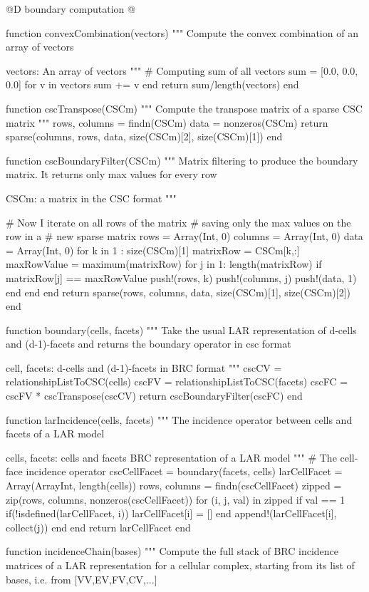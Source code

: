 \documentclass[11pt,oneside]{article}	%
\begin{document}
@D boundary computation
@{function convexCombination(vectors)
  """
  Compute the convex combination of an
  array of vectors

  vectors: An array of vectors
  """
  # Computing sum of all vectors
  sum = [0.0, 0.0, 0.0]
  for v in vectors
    sum += v
  end
  return sum/length(vectors)
end

function cscTranspose(CSCm)
  """
  Compute the transpose matrix of a
  sparse CSC matrix
  """
  rows, columns = findn(CSCm)
  data = nonzeros(CSCm)
  return sparse(columns, rows, data, size(CSCm)[2], size(CSCm)[1])
end

function cscBoundaryFilter(CSCm)
  """
  Matrix filtering to produce the boundary
  matrix. It returns only max values for
  every row

  CSCm: a matrix in the CSC format
  """

  # Now I iterate on all rows of the matrix
  # saving only the max values on the row in a
  # new sparse matrix
  rows = Array(Int, 0)
  columns = Array(Int, 0)
  data = Array(Int, 0)
  for k in 1 : size(CSCm)[1]
    matrixRow = CSCm[k,:]
    maxRowValue = maximum(matrixRow)
    for j in 1: length(matrixRow)
      if matrixRow[j] == maxRowValue
        push!(rows, k)
        push!(columns, j)
        push!(data, 1)
      end
    end
  end
  return sparse(rows, columns, data, size(CSCm)[1], size(CSCm)[2])
end

function boundary(cells, facets)
  """
  Take the usual LAR representation of d-cells
  and (d-1)-facets and returns the
  boundary operator in csc format

  cell, facets: d-cells and (d-1)-facets in BRC format
  """
  cscCV = relationshipListToCSC(cells)
  cscFV = relationshipListToCSC(facets)
  cscFC = cscFV * cscTranspose(cscCV)
  return cscBoundaryFilter(cscFC)
end


function larIncidence(cells, facets)
  """
  The incidence operator between cells
  and facets of a LAR model

  cells, facets: cells and facets BRC representation
  of a LAR model
  """
  # The cell-face incidence operator
  cscCellFacet = boundary(facets, cells)
  larCellFacet = Array(Array{Int}, length(cells))
  rows, columns = findn(cscCellFacet)
  zipped = zip(rows, columns, nonzeros(cscCellFacet))
  for (i, j, val) in zipped
    if val == 1
      if(!isdefined(larCellFacet, i))
        larCellFacet[i] = []
      end
      append!(larCellFacet[i], collect(j))
    end
  end
  return larCellFacet
end

function incidenceChain(bases)
  """
  Compute the full stack of BRC incidence matrices of
  a LAR representation for a cellular complex, starting
  from its list of bases, i.e. from [VV,EV,FV,CV,...]

}
\end{document}

